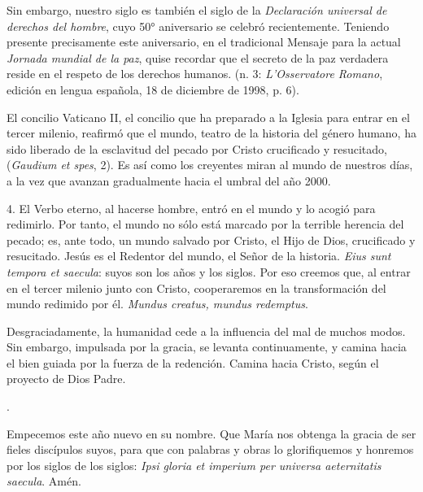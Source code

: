 \begin{body}
	Sin embargo, nuestro siglo es también el siglo de la \emph{Declaración universal de derechos del hombre}, cuyo 50° aniversario se celebró recientemente. Teniendo presente precisamente este aniversario, en el tradicional Mensaje para la actual \emph{Jornada mundial de la paz}, quise recordar que el secreto de la paz verdadera reside en el respeto de los derechos humanos.  (n. 3: \emph{L'Osservatore Romano}, edición en lengua española, 18 de diciembre de 1998, p. 6).
	
	El concilio Vaticano II, el concilio que ha preparado a la Iglesia para entrar en el tercer milenio, reafirmó que el mundo, teatro de la historia del género humano, ha sido liberado de la esclavitud del pecado por Cristo crucificado y resucitado,  (\emph{Gaudium et spes}, 2). Es así como los creyentes miran al mundo de nuestros días, a la vez que avanzan gradualmente hacia el umbral del año 2000.
	
	4. El Verbo eterno, al hacerse hombre, entró en el mundo y lo acogió para redimirlo. Por tanto, el mundo no sólo está marcado por la terrible herencia del pecado; es, ante todo, un mundo salvado por Cristo, el Hijo de Dios, crucificado y resucitado. Jesús es el Redentor del mundo, el Señor de la historia. \emph{Eius sunt tempora et saecula}: suyos son los años y los siglos. Por eso creemos que, al entrar en el tercer milenio junto con Cristo, cooperaremos en la transformación del mundo redimido por él. \emph{Mundus creatus, mundus redemptus}.
	
	Desgraciadamente, la humanidad cede a la influencia del mal de muchos modos. Sin embargo, impulsada por la gracia, se levanta continuamente, y camina hacia el bien guiada por la fuerza de la redención. Camina hacia Cristo, según el proyecto de Dios Padre.
	
	.
	
	Empecemos este año nuevo en su nombre. Que María nos obtenga la gracia de ser fieles discípulos suyos, para que con palabras y obras lo glorifiquemos y honremos por los siglos de los siglos: \emph{Ipsi gloria et imperium per universa aeternitatis saecula}. Amén.
\end{body}

